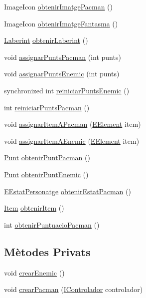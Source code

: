\begin{DoxyCompactItemize}
Image\+Icon \hyperlink{classlogica_1_1_partida_a911707e2f7d9a332000e3d04b3b182b0}{obtenir\+Imatge\+Pacman} ()
\item 
Image\+Icon \hyperlink{classlogica_1_1_partida_ab5074b8c36a8a958059aa9e9732f66b8}{obtenir\+Imatge\+Fantasma} ()
\item 
\hyperlink{classlogica_1_1laberints_1_1_laberint}{Laberint} \hyperlink{classlogica_1_1_partida_a0e353c036fb9655c85a71c5630cd3728}{obtenir\+Laberint} ()
\item 
void \hyperlink{classlogica_1_1_partida_a8c77a48d2b451ae4f01ed0ff0df29b15}{assignar\+Punts\+Pacman} (int punts)
\item 
void \hyperlink{classlogica_1_1_partida_af6bb37861993d640fbe4f4b8360778da}{assignar\+Punts\+Enemic} (int punts)
\item 
synchronized int \hyperlink{classlogica_1_1_partida_a169e110dd937b6b85725545e8048624e}{reiniciar\+Punts\+Enemic} ()
\item 
int \hyperlink{classlogica_1_1_partida_ac892458094c3a52cdeb4745e8b1179c4}{reiniciar\+Punts\+Pacman} ()
\item 
void \hyperlink{classlogica_1_1_partida_a4c54275963b78eb6f0646c479a2e6823}{assignar\+Item\+A\+Pacman} (\hyperlink{enumlogica_1_1enumeracions_1_1_e_element}{E\+Element} item)
\item 
void \hyperlink{classlogica_1_1_partida_a5b3670c7515defc5102dfadb00bcf3ef}{assignar\+Item\+A\+Enemic} (\hyperlink{enumlogica_1_1enumeracions_1_1_e_element}{E\+Element} item)
\item 
\hyperlink{classlogica_1_1_punt}{Punt} \hyperlink{classlogica_1_1_partida_a9b8115a07b219eb89ce5538c05439142}{obtenir\+Punt\+Pacman} ()
\item 
\hyperlink{classlogica_1_1_punt}{Punt} \hyperlink{classlogica_1_1_partida_a2fc3ffb51588957e937051a1d28d1e56}{obtenir\+Punt\+Enemic} ()
\item 
\hyperlink{enumlogica_1_1_personatge_1_1_e_estat_personatge}{E\+Estat\+Personatge} \hyperlink{classlogica_1_1_partida_a49fe2eeab085f4735558aca7464cd07d}{obtenir\+Estat\+Pacman} ()
\item 
\hyperlink{classlogica_1_1_item}{Item} \hyperlink{classlogica_1_1_partida_a59160392ea2e5a2b5482f3deb29af5aa}{obtenir\+Item} ()
\item 
int \hyperlink{classlogica_1_1_partida_adc8512f949534ba5aee17a23d9a04c1b}{obtenir\+Puntuacio\+Pacman} ()
\end{DoxyCompactItemize}
\subsection*{Mètodes Privats}
\begin{DoxyCompactItemize}
\item 
void \hyperlink{classlogica_1_1_partida_aca02d96c8f54d70a8bfa12927e75ba49}{crear\+Enemic} ()
\item 
void \hyperlink{classlogica_1_1_partida_aff3942c516b8a711b3d13e09453f5c67}{crear\+Pacman} (\hyperlink{interfacelogica_1_1controladors__pacman_1_1_i_controlador}{I\+Controlador} controlador)
\end{DoxyCompactItemize}
